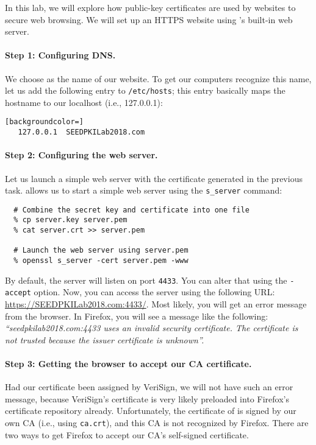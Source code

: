 In this lab, we will explore how public-key certificates 
are used by websites to secure web browsing. We will set up
an HTTPS website using \openssl's built-in web server. 


\paragraph{Step 1: Configuring DNS.}
We choose \pkiserver as the name of our website.
To get our computers recognize this name,
let us add the following entry to \texttt{/etc/hosts}; this entry
basically maps the hostname \pkiserver to 
our localhost (i.e., 127.0.0.1):

   
\begin{lstlisting}[backgroundcolor=]
   127.0.0.1  SEEDPKILab2018.com
\end{lstlisting}


\paragraph{Step 2: Configuring the web server.}
Let us launch a simple web server with the certificate 
generated in the previous task. \OpenSSL allows us 
to start a simple web server using the \texttt{s\_server} command: 

\begin{lstlisting}
  # Combine the secret key and certificate into one file
  % cp server.key server.pem
  % cat server.crt >> server.pem
 
  # Launch the web server using server.pem
  % openssl s_server -cert server.pem -www
\end{lstlisting}

By default, the server will listen on port {\tt 4433}. You can alter that using 
the {\tt -accept} option. Now, you can access the server using the following
URL: \url{https://SEEDPKILab2018.com:4433/}.
Most likely, you will get an error message from the browser. In Firefox, you will
see a message like the following:
{\em ``seedpkilab2018.com:4433 uses an invalid security certificate.
The certificate is not trusted because the issuer certificate is unknown''.}


\paragraph{Step 3: Getting the browser to accept our CA certificate.}
Had our certificate been assigned by VeriSign, we will not have such an error
message, because VeriSign's certificate is very likely preloaded into
Firefox's certificate repository already. Unfortunately, the 
certificate of \pkiserver is signed by our own CA (i.e., using 
{\tt ca.crt}), and this CA is not recognized by Firefox. There are two ways to
get Firefox to accept our CA's self-signed certificate. 

